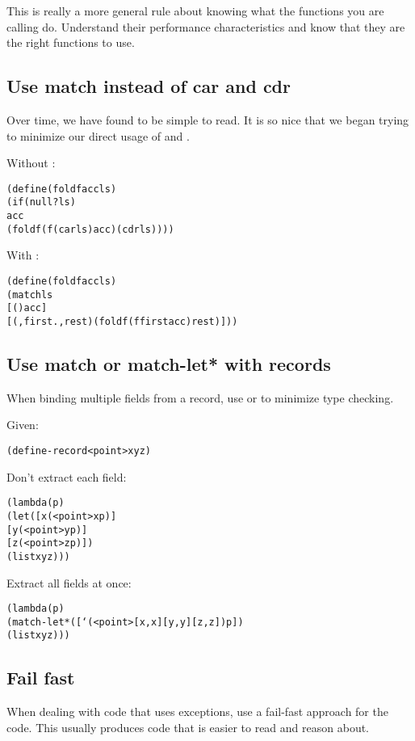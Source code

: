 \documentclass[letterpaper,11pt,twoside,final]{article}
\begin{document}
This is really a more general rule about knowing what the functions
you are calling do. Understand their performance characteristics and
know that they are the right functions to use.

\subsection* {Use match instead of car and cdr}

Over time, we have found  to be simple to read. It is
so nice that we began trying to minimize our direct usage of
 and .

Without :
\antipar
\begin{alltt}
(define (fold f acc ls)
  (if (null? ls)
      acc
      (fold f (f (car ls) acc) (cdr ls))))
\end{alltt}

With :
\antipar
\begin{alltt}
(define (fold f acc ls)
  (match ls
    [() acc]
    [(,first . ,rest) (fold f (f first acc) rest)]))
\end{alltt}

\subsection* {Use match or match-let* with records}

When binding multiple fields from a record, use  or
 to minimize type checking.

Given:
\antipar
\begin{alltt}
(define-record <point> x y z)
\end{alltt}

Don't extract each field:
\antipar
\begin{alltt}
(lambda (p)
  (let ([x (<point> x p)]
        [y (<point> y p)]
        [z (<point> z p)])
    (list x y z)))
\end{alltt}

Extract all fields at once:
\antipar
\begin{alltt}
(lambda (p)
  (match-let* ([`(<point> [x ,x] [y ,y] [z ,z]) p])
    (list x y z)))
\end{alltt}

\subsection* {Fail fast}

When dealing with code that uses exceptions, use a fail-fast approach
for the code. This usually produces code that is easier to read and
reason about.
\end{document}
